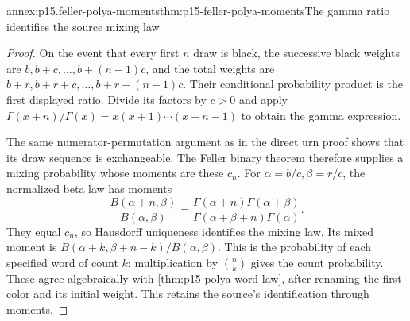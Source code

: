 \begin{annexitem}{annex:p15.feller-polya-moments}{thm:p15-feller-polya-moments}{The gamma ratio identifies the source mixing law}
\begin{proof}
On the event that every first \(n\) draw is black, the successive
black weights are \(b,b+c,\ldots,b+(n-1)c\), and the total weights
are \(b+r,b+r+c,\ldots,b+r+(n-1)c\).
Their conditional probability product is the first displayed ratio.
Divide its factors by \(c>0\) and apply
\(\Gamma(x+n)/\Gamma(x)=x(x+1)\cdots(x+n-1)\)
to obtain the gamma expression.

The same numerator-permutation argument as in the direct urn proof
shows that its draw sequence is exchangeable.
The Feller binary theorem therefore supplies a mixing probability
whose moments are these \(c_n\).
For \(\alpha=b/c,\beta=r/c\), the normalized beta law has moments
\[
                   \frac{B(\alpha+n,\beta)}{B(\alpha,\beta)}
                    =\frac{\Gamma(\alpha+n)\Gamma(\alpha+\beta)}
                            {\Gamma(\alpha+\beta+n)\Gamma(\alpha)}.
\]
They equal \(c_n\), so Hausdorff uniqueness identifies the mixing law.
Its mixed moment is
\(B(\alpha+k,\beta+n-k)/B(\alpha,\beta)\).
This is the probability of each specified word of count \(k\);
multiplication by \(\binom nk\) gives the count probability.
These agree algebraically with \cref{thm:p15-polya-word-law},
after renaming the first color and its initial weight.
This retains the source's identification through moments.
\end{proof}
\end{annexitem}

